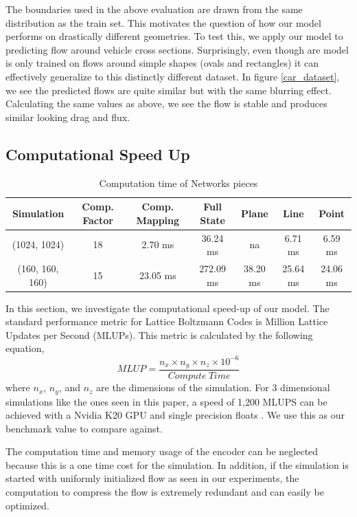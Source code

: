 \documentclass{article}
\begin{document}
The boundaries used in the above evaluation are drawn from the same distribution as the train set. This motivates the question of how our model performs on drastically different geometries. To test this, we apply our model to predicting flow around vehicle cross sections. Surprisingly, even though are model is only trained on flows around simple shapes (ovals and rectangles) it can effectively generalize to this distinctly different dataset. In figure \ref{car_dataset}, we see the predicted flows are quite similar but with the same blurring effect. Calculating the same values as above, we see the flow is stable and produces similar looking drag and flux.


\subsection{Computational Speed Up}

\begin{table}[]
\small
\caption{Computation time of Networks pieces} \label{compute_times}
\centering
\begin{tabular}{|c|cccccc|}
\hline
Simulation    & Comp. Factor       & Comp. Mapping       & Full State  & Plane      & Line       & Point \\ \hline
(1024, 1024)  & 18                 & 2.70 ms            & 36.24 ms   & na         & 6.71 ms   & 6.59 ms \\
(160, 160, 160) & 15                 & 23.05 ms           & 272.09 ms  & 38.20 ms  & 25.64 ms  & 24.06 ms  
\\ \hline
\end{tabular}
\label{computation_table}
\end{table}


In this section, we investigate the computational speed-up of our model. The standard performance metric for Lattice Boltzmann Codes is Million Lattice Updates per Second (MLUPs). This metric is calculated by the following equation,
\begin{equation}
  MLUP = \frac{n_x \times n_y \times n_z \times 10^{-6}}{Compute \ Time}
\end{equation}
 where $n_x$, $n_y$, and $n_z$ are the dimensions of the simulation. For 3 dimensional simulations like the ones seen in this paper, a speed of 1,200 MLUPS can be achieved with a Nvidia K20 GPU and single precision floats \cite{januszewski2014sailfish}. We use this as our benchmark value to compare against.

The computation time and memory usage of the encoder can be neglected because this is a one time cost for the simulation. In addition, if the simulation is started with uniformly initialized flow as seen in our experiments, the computation to compress the flow is extremely redundant and can easily be optimized.
\end{document}
